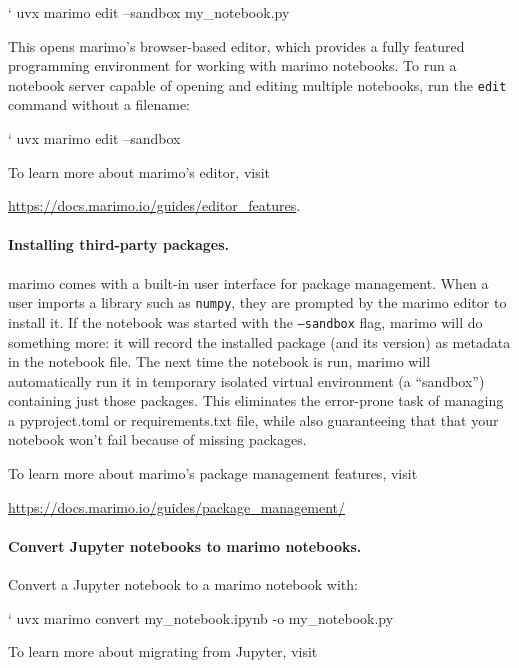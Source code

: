 \documentclass{article}
\begin{document}
\begin{shellcmd}
` uvx marimo edit --sandbox my_notebook.py
\end{shellcmd}
This opens marimo's browser-based editor, which provides a fully featured programming
environment for working with marimo notebooks. To run a notebook server capable
of opening and editing multiple notebooks, run the \texttt{edit} command
without a filename:

\begin{shellcmd}
` uvx marimo edit --sandbox 
\end{shellcmd}
To learn more about marimo's editor, visit

\begin{center}
  \url{https://docs.marimo.io/guides/editor_features}.
\end{center}


\paragraph{Installing third-party packages.}
marimo comes with a built-in user interface for package management. When a user imports
a library such as \texttt{numpy}, they are prompted by the marimo editor to install it. If the notebook
was started with the \texttt{--sandbox} flag, marimo will do something more: it will
record the installed package (and its version) as metadata in the notebook file.
The next time the notebook is run, marimo will automatically run it in temporary
isolated virtual environment (a ``sandbox'') containing just those packages.
This eliminates the error-prone task of managing a pyproject.toml or
requirements.txt file, while also guaranteeing that that your notebook won't
fail because of missing packages.

To learn more about marimo's package management features, visit

\begin{center}
\url{https://docs.marimo.io/guides/package_management/}
\end{center}

\paragraph{Convert Jupyter notebooks to marimo notebooks.} Convert a Jupyter notebook
to a marimo notebook with:

\begin{shellcmd}
` uvx marimo convert my_notebook.ipynb -o my_notebook.py
\end{shellcmd}
To learn more about migrating from Jupyter, visit
\end{document}
